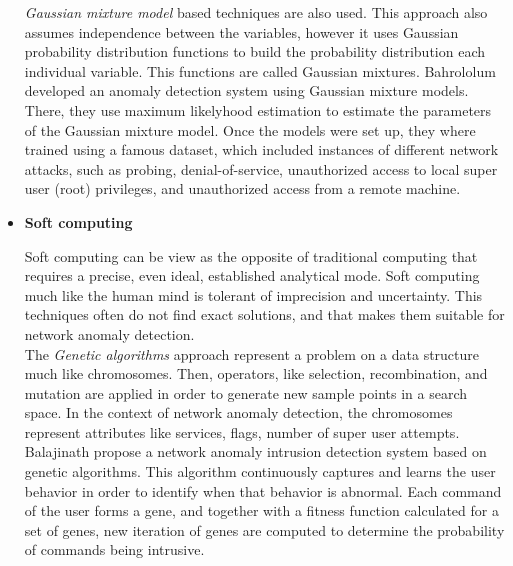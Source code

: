 \begin{itemize}
\textit{Gaussian mixture model} based techniques are also used. This approach also assumes independence between the variables, however it uses Gaussian probability distribution functions to build the probability distribution each individual variable. This functions are called Gaussian mixtures. Bahrololum \etAl \cite{Bahrololum2008} developed an anomaly detection system using Gaussian mixture models. There, they use maximum likelyhood estimation to estimate the parameters of the Gaussian mixture model. Once the models were set up, they where trained using a famous dataset, which included instances of different network attacks, such as probing, denial-of-service, unauthorized access to local super user (root) privileges, and unauthorized access from a remote machine\cite{Bahrololum2008}. \\


		\item \textbf{Soft computing}
		
		
Soft computing can be view as the opposite of traditional computing that requires a precise, even ideal, established analytical mode. Soft computing much like the human mind is tolerant of imprecision and uncertainty. This techniques often do not find exact solutions, and that makes them suitable for network anomaly detection.\\

The \textit{Genetic algorithms} approach represent a problem on a data structure much like chromosomes. Then, operators, like selection, recombination, and mutation are applied in order to generate new sample points in a search space\cite{geneticAlgos}. 
In the context of network anomaly detection, the chromosomes represent attributes like services, flags, number of super user attempts\cite{Bhattacharyya:2013:NAD:2505468}. \\	
Balajinath \etAl propose a network anomaly intrusion detection system based on genetic algorithms. This algorithm continuously captures and learns the user behavior in order to identify when that behavior is abnormal.  \cite{Balajinath:2001:IDT:2294491.2294970} Each command of the user forms a gene, and together with a fitness function calculated for a set of genes, new iteration of genes are computed to determine the probability of commands being intrusive.\\


\end{itemize}
